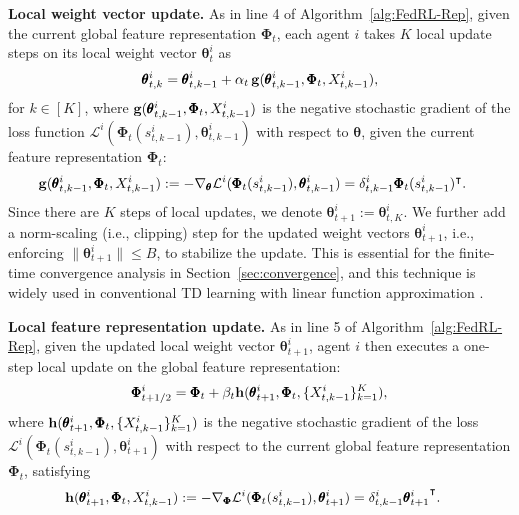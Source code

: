 \documentclass{article} %
\theoremstyle{plain}
\theoremstyle{definition}
\theoremstyle{remark}
\newcommand{\cL}{\mathcal{L}}
\begin{document}
\textbf{Local weight vector update.} As in line 4 of Algorithm~\ref{alg:FedRL-Rep}, given the current global feature representation $\pmb{\Phi}_t$, each agent $i$ takes $K$ local update steps on its local weight vector $\pmb{\theta}_{t}^i$ as 
\begin{align}\label{eq:local_model_update-TD}
\pmb{\theta}_{t,k}^i=\pmb{\theta}_{t,k-1}^i+\alpha_t \, \bg(\pmb{\theta}_{t,k-1}^i,  \pmb{\Phi}_t, X_{t,k-1}^i),
\end{align}
for $k\in[K]$, where ${\mathbf{g}}(\pmb{\theta}_{t,k-1}^i, \pmb{\Phi}_t, X^i_{t,k-1})$ is the negative stochastic gradient of the loss function $\cL^i(\pmb{\Phi}_t(s_{t,k-1}^i), \pmb{\theta}_{t,k-1}^i)$ with respect to $\pmb{\theta}$, given the current feature representation $\pmb{\Phi}_t$: 
\begin{align}\label{eq:g}
    \bg(\pmb{\theta}_{t,k-1}^i, \pmb{\Phi}_t, X^i_{t,k-1})&:=-\nabla_{\pmb{\theta}} \cL^i(\pmb{\Phi}_t(s_{t,k-1}^i), \pmb{\theta}_{t,k-1}^i)=\delta_{t,k-1}^i\pmb{\Phi}_t(s_{t,k-1}^i)^\intercal. 
\end{align}
Since there are $K$ steps of local updates, we denote $\pmb{\theta}_{t+1}^i:=\pmb{\theta}_{t,K}^i.$ 
We further add a norm-scaling (i.e., clipping) step for the updated weight vectors $\pmb{\theta}_{t+1}^i$, i.e., enforcing $\|\pmb{\theta}_{t+1}^i\|\leq B$, to stabilize the update. This is essential for the finite-time convergence analysis in Section~\ref{sec:convergence}, and this technique is widely used in conventional TD learning with linear function approximation \citep{bhandari2018finite}.  


\textbf{Local feature representation update.} As in line 5 of Algorithm~\ref{alg:FedRL-Rep}, given the updated local weight vector $\pmb{\theta}_{t+1}^i$, agent $i$ then executes a one-step local update on the global feature representation: 
\begin{align}\label{eq:global_model_update-TD}
\pmb{\Phi}_{t+1/2}^i=\pmb{\Phi}_{t}+\beta_t\bh(\pmb{\theta}_{t+1}^i, \pmb{\Phi}_t, \{X_{t,k-1}^i\}_{k=1}^K),  
\end{align}
where $\mathbf{h}(\pmb{\theta}_{t+1}^i, \pmb{\Phi}_t, \{X_{t,k-1}^i\}_{k=1}^K)$ is the negative stochastic gradient of the loss $\cL^i(\pmb{\Phi}_t(s_{t,k-1}^i), \pmb{\theta}_{t+1}^i)$ with respect to the current global feature representation $\pmb{\Phi}_t$, satisfying
\begin{align}
    \label{eq:h}\bh(\pmb{\theta}_{t+1}^i, \pmb{\Phi}_t, X_{t,k-1}^i) &:=-\nabla_{\pmb{\Phi}} \cL^i(\pmb{\Phi}_t(s_{t,k-1}^i), \pmb{\theta}_{t+1}^i)= \delta_{t,k-1}^i{\pmb{\theta}_{t+1}^i}^\intercal.
\end{align}
\end{document}

